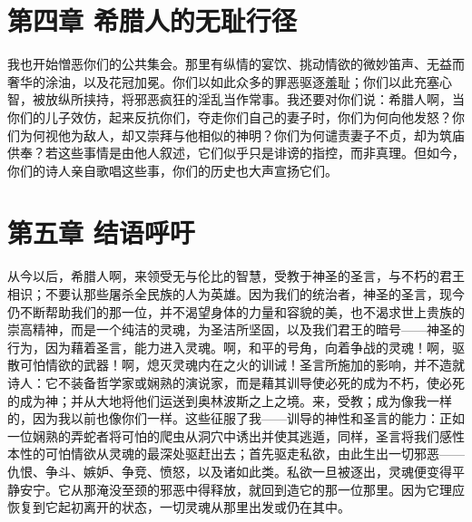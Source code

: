 
\section{第四章 希腊人的无耻行径}

我也开始憎恶你们的公共集会。那里有纵情的宴饮、挑动情欲的微妙笛声、无益而奢华的涂油，以及花冠加冕。你们以如此众多的罪恶驱逐羞耻；你们以此充塞心智，被放纵所挟持，将邪恶疯狂的淫乱当作常事。我还要对你们说：希腊人啊，当你们的儿子效仿，起来反抗你们，夺走你们自己的妻子时，你们为何向他发怒？你们为何视他为敌人，却又崇拜与他相似的神明？你们为何谴责妻子不贞，却为筑庙供奉？若这些事情是由他人叙述，它们似乎只是诽谤的指控，而非真理。但如今，你们的诗人亲自歌唱这些事，你们的历史也大声宣扬它们。\par


\section{第五章 结语呼吁}

从今以后，希腊人啊，来领受无与伦比的智慧，受教于神圣的圣言，与不朽的君王相识；不要认那些屠杀全民族的人为英雄。因为我们的统治者，神圣的圣言，现今仍不断帮助我们的那一位，并不渴望身体的力量和容貌的美，也不渴求世上贵族的崇高精神，而是一个纯洁的灵魂，为圣洁所坚固，以及我们君王的暗号——神圣的行为，因为藉着圣言，能力进入灵魂。啊，和平的号角，向着争战的灵魂！啊，驱散可怕情欲的武器！啊，熄灭灵魂内在之火的训诫！圣言所施加的影响，并不造就诗人：它不装备哲学家或娴熟的演说家，而是藉其训导使必死的成为不朽，使必死的成为神；并从大地将他们运送到奥林波斯之上之境。来，受教；成为像我一样的，因为我以前也像你们一样。这些征服了我——训导的神性和圣言的能力：正如一位娴熟的弄蛇者将可怕的爬虫从洞穴中诱出并使其逃遁，同样，圣言将我们感性本性的可怕情欲从灵魂的最深处驱赶出去；首先驱走私欲，由此生出一切邪恶——仇恨、争斗、嫉妒、争竞、愤怒，以及诸如此类。私欲一旦被逐出，灵魂便变得平静安宁。它从那淹没至颈的邪恶中得释放，就回到造它的那一位那里。因为它理应恢复到它起初离开的状态，一切灵魂从那里出发或仍在其中。\par

